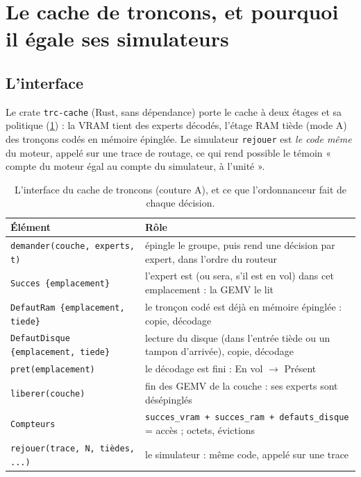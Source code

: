 \section{Le cache de troncons, et pourquoi il égale ses simulateurs}\label{sec:t2o-trc-cache}

\subsection{L'interface}

Le crate \texttt{trc-cache} (Rust, sans dépendance) porte le cache à deux étages et sa politique (\cref{tab:t2o-interface}) : la VRAM tient des experts décodés, l'étage RAM tiède (mode A) des tronçons codés en mémoire épinglée. Le simulateur \texttt{rejouer} est \emph{le code même} du moteur, appelé sur une trace de routage, ce qui rend possible le témoin « compte du moteur égal au compte du simulateur, à l'unité ».

\begin{table}[ht]
\centering\small
\caption[L'interface du cache]{L'interface du cache de troncons (couture A), et ce que l'ordonnanceur fait de chaque décision.}
\label{tab:t2o-interface}
\begin{tabularx}{\linewidth}{@{}lX@{}}
\toprule
Élément & Rôle \\
\midrule
\texttt{demander(couche, experts, t)} & épingle le groupe, puis rend une décision par expert, dans l'ordre du routeur \\
\texttt{Succes \{emplacement\}} & l'expert est (ou sera, s'il est en vol) dans cet emplacement : la GEMV le lit \\
\texttt{DefautRam \{emplacement, tiede\}} & le tronçon codé est déjà en mémoire épinglée : copie, décodage \\
\texttt{DefautDisque \{emplacement, tiede\}} & lecture du disque (dans l'entrée tiède ou un tampon d'arrivée), copie, décodage \\
\texttt{pret(emplacement)} & le décodage est fini : En vol $\to$ Présent \\
\texttt{liberer(couche)} & fin des GEMV de la couche : ses experts sont désépinglés \\
\texttt{Compteurs} & \texttt{succes\_vram + succes\_ram + defauts\_disque} = accès ; octets, évictions \\
\texttt{rejouer(trace, N, tièdes, ...)} & le simulateur : même code, appelé sur une trace \\
\bottomrule
\end{tabularx}
\end{table}


